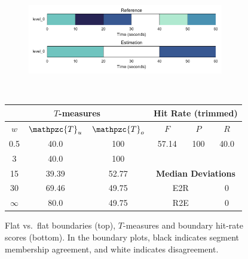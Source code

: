 \documentclass{article}
\def\shag{\ensuremath{\mathpzc{T}}}
\begin{document}
\begin{figure}
  \centering
  \begin{subfigure}{0.5\textwidth}
    \centering
    \includegraphics[width=0.94\textwidth]{figs/flat-flat.pdf}
  \end{subfigure}%
  \\
  \begin{minipage}{0.5\textwidth}
    \centering
    \vspace{10pt}
    \begin{tabular}{|c|c|c||c|c|c|}
      \hline
      \multicolumn{3}{|c||}{\textbf{$T$-measures}} & \multicolumn{3}{c|}{\textbf{Hit Rate (trimmed)}} \\
      \hline
      $w$ & $\shag_u$   & $\shag_o$ & $F$     & $P$     & $R$ \\
      \hline
      0.5       & 40.0   & 100   & 57.14  & 100 & 40.0 \\
      \cline{4-6}
      3         & 40.0   & 100  \\
      \cline{4-6}
      15        & 39.39  & 52.77 & \multicolumn{3}{c|}{\textbf{Median Deviations}}   \\
      \cline{4-6}
      30        & 69.46  & 49.75 & \multicolumn{2}{c|}{E2R} & 0 \\
      $\infty$  & 80.0   & 49.75 & \multicolumn{2}{c|}{R2E} & 0 \\  
      \hline
    \end{tabular}
  \end{minipage}
  \caption{Flat vs.\ flat boundaries (top), $T$-measures and boundary hit-rate
  scores (bottom).  In the boundary plots, black indicates segment membership agreement, and white indicates disagreement.}
  \label{fig:flat-flat}
\end{figure}
\end{document}
